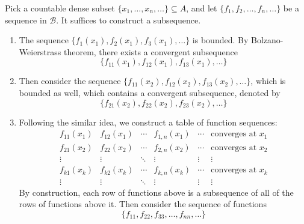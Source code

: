 Pick a countable dense subset $\{x_1,\dots,x_n,\dots\}\subseteq A$, and let $\{f_1,f_2,\dots,f_n,\dots\}$ be a sequence in $\mathcal{B}$. It suffices to construct a subsequence.
\begin{enumerate}
\item
The sequence $\{f_1(x_1),f_2(x_1),f_3(x_1),\dots\}$ is bounded. By Bolzano-Weierstrass theorem, there exists a convergent subsequence 
\[
\{f_{11}(x_1),f_{12}(x_1),f_{13}(x_1),\dots\}
\]
\item
Then consider the sequence $\{f_{11}(x_2),f_{12}(x_2),f_{13}(x_2),\dots\}$, which is bounded as well, which contains a convergent subsequence, denoted by
\[
\{f_{21}(x_2),f_{22}(x_2),f_{23}(x_2),\dots\}
\]
\item
Following the similar idea, we construct a table of function sequences: 
\begin{equation}\label{Eq:14:1}
\begin{array}{lllllll}
f_{11}(x_1)&f_{12}(x_1)&\cdots&f_{1,n}(x_1)&\cdots&\mbox{converges at $x_1$}\\
f_{21}(x_2)&f_{22}(x_2)&\cdots&f_{2,n}(x_2)&\cdots&\mbox{converges at $x_2$}\\
\vdots&\vdots&\ddots&\vdots&\vdots&\vdots\\
f_{k1}(x_k)&f_{k2}(x_k)&\cdots&f_{k,n}(x_k)&\cdots&\mbox{converges at $x_k$}\\
\vdots&\vdots&\ddots&\vdots&\vdots&\vdots
\end{array}
\end{equation}
By construction, each row of functions above is a subsequence of all of the rows of functions above it. Then consider the sequence of functions 
\[
\{f_{11},f_{22},f_{33},\dots,f_{nn},\dots\}
\]
\end{enumerate}

